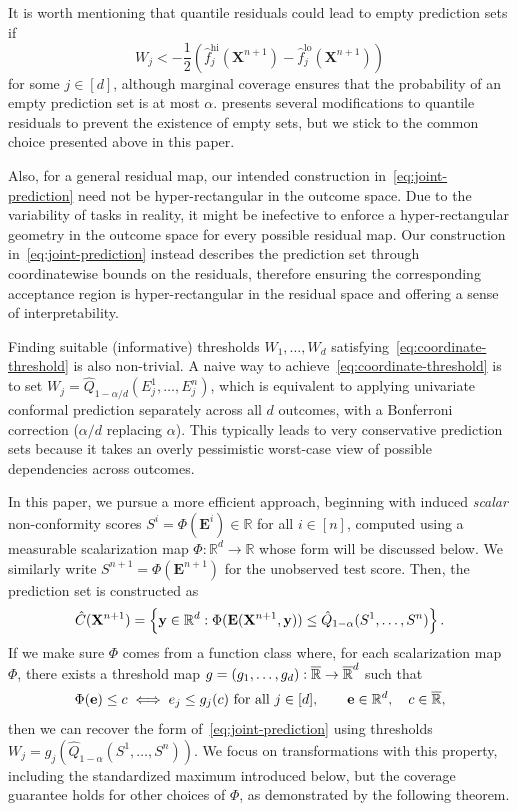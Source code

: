 {\color{brown}
It is worth mentioning that quantile residuals could lead to empty prediction sets if
\[
W_j<
-\frac12\left(
\hat f_j^{\mathrm{hi}}(\mathbf X^{n+1})
-
\hat f_j^{\mathrm{lo}}(\mathbf X^{n+1})
\right)
\]
for some $j\in[d]$, although marginal coverage ensures that the probability of an empty prediction set is at most $\alpha$. \citet{Sesia_2020} presents several modifications to quantile residuals to prevent the existence of empty sets, but we stick to the common choice presented above in this paper.
}

Also, for a general residual map, our intended construction in~\eqref{eq:joint-prediction} need not be hyper-rectangular in the outcome space. Due to the variability of tasks in reality, it might be inefective to enforce a hyper-rectangular geometry in the outcome space for every possible residual map. Our construction in~\eqref{eq:joint-prediction} instead describes the prediction set through coordinatewise bounds on the residuals, therefore ensuring the corresponding acceptance region is hyper-rectangular in the residual space and offering a sense of interpretability.

Finding suitable (informative) thresholds $W_1,\ldots,W_d$ satisfying~\eqref{eq:coordinate-threshold} is also non-trivial.
A naive way to achieve~\eqref{eq:coordinate-threshold} is to set $W_j=\hat Q_{1-\alpha/d}(E_j^1,\ldots,E_j^n)$, which is equivalent to applying univariate conformal prediction separately across all $d$ outcomes, with a Bonferroni correction ($\alpha/d$ replacing $\alpha$).
This typically leads to very conservative prediction sets because it takes an overly pessimistic worst-case view of possible dependencies across outcomes.

In this paper, we pursue a more efficient approach, beginning with induced {\em scalar} non-conformity scores $S^i=\Phi(\mathbf E^i)\in\mathbb R$ for all $i\in[n]$, computed using a measurable scalarization map $\Phi:\mathbb R^d\to\mathbb R$ whose form will be discussed below. We similarly write $S^{n+1}=\Phi(\mathbf E^{n+1})$ for the unobserved test score.
Then, the prediction set is constructed as
\begin{equation}
\hat C(\mathbf X^{n+1})
=
\left\{
\mathbf y\in\mathbb{R}^d:
\Phi(\mathbf E(\mathbf X^{n+1},\mathbf y))
\leq\hat Q_{1-\alpha}(S^1,\ldots,S^n)
\right\}.
\label{eq:joint-prediction-scalar}
\end{equation}
If we make sure $\Phi$ comes from a function class where, for each scalarization map $\Phi$, there exists a threshold map $g=(g_1,\ldots,g_d):\overline{\mathbb{R}}\to\overline{\mathbb{R}}^d$ such that
\[
\Phi(\mathbf e)\leq c
\iff
e_j\leq g_j(c)\text{ for all }j\in[d],
\qquad
\mathbf e\in\mathbb{R}^d,\quad c\in\overline{\mathbb{R}},
\]
then we can recover the form of~\eqref{eq:joint-prediction} using thresholds $W_j=g_j(\hat Q_{1-\alpha}(S^1,\ldots,S^n))$. We focus on transformations with this property, including the standardized maximum introduced below, but the coverage guarantee holds for other choices of $\Phi$, as demonstrated by the following theorem.

